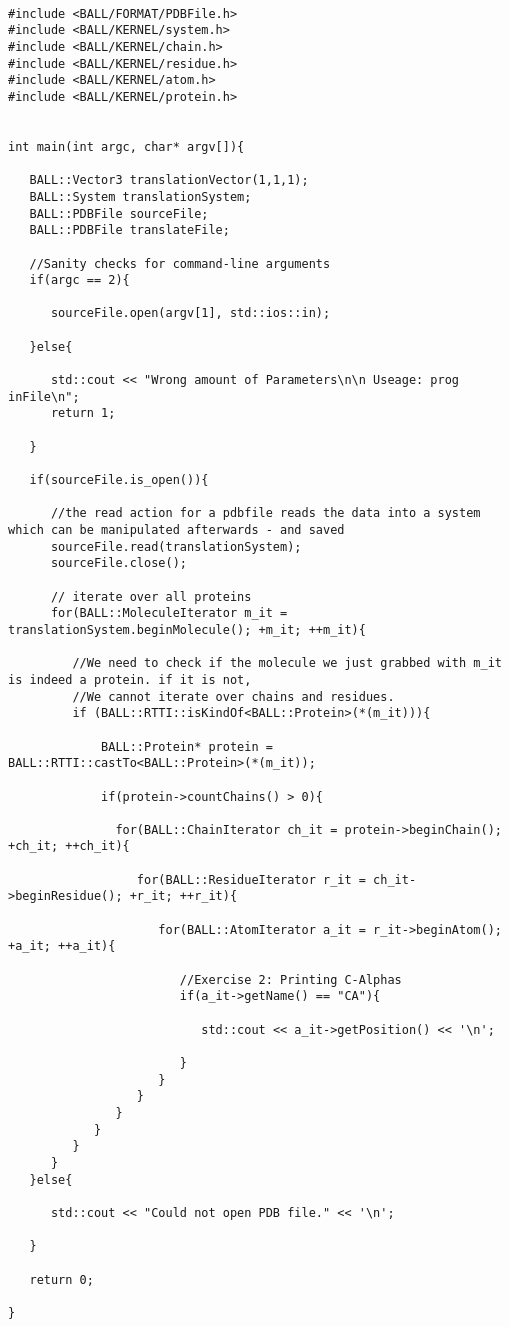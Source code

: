 \documentclass[11pt]{article}
\begin{document}
\begin{lstlisting}

#include <BALL/FORMAT/PDBFile.h>
#include <BALL/KERNEL/system.h>
#include <BALL/KERNEL/chain.h>
#include <BALL/KERNEL/residue.h>
#include <BALL/KERNEL/atom.h>
#include <BALL/KERNEL/protein.h>


int main(int argc, char* argv[]){

   BALL::Vector3 translationVector(1,1,1);
   BALL::System translationSystem;
   BALL::PDBFile sourceFile;
   BALL::PDBFile translateFile;

   //Sanity checks for command-line arguments
   if(argc == 2){

      sourceFile.open(argv[1], std::ios::in);

   }else{

      std::cout << "Wrong amount of Parameters\n\n Useage: prog inFile\n";
      return 1;

   }

   if(sourceFile.is_open()){

      //the read action for a pdbfile reads the data into a system which can be manipulated afterwards - and saved
      sourceFile.read(translationSystem);
      sourceFile.close();

      // iterate over all proteins
      for(BALL::MoleculeIterator m_it = translationSystem.beginMolecule(); +m_it; ++m_it){

         //We need to check if the molecule we just grabbed with m_it is indeed a protein. if it is not,
         //We cannot iterate over chains and residues.
         if (BALL::RTTI::isKindOf<BALL::Protein>(*(m_it))){

             BALL::Protein* protein = BALL::RTTI::castTo<BALL::Protein>(*(m_it));

             if(protein->countChains() > 0){

               for(BALL::ChainIterator ch_it = protein->beginChain(); +ch_it; ++ch_it){

                  for(BALL::ResidueIterator r_it = ch_it->beginResidue(); +r_it; ++r_it){

                     for(BALL::AtomIterator a_it = r_it->beginAtom(); +a_it; ++a_it){

                        //Exercise 2: Printing C-Alphas
                        if(a_it->getName() == "CA"){

                           std::cout << a_it->getPosition() << '\n';

                        }
                     }                   
                  }
               }
            }
         }
      }
   }else{

      std::cout << "Could not open PDB file." << '\n';

   }

   return 0;

}

\end{lstlisting}
\end{document}

